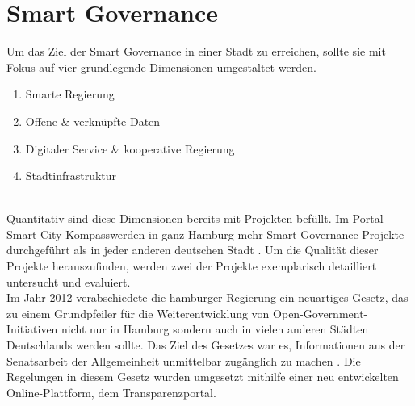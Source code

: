 \section{Smart Governance}

Um das Ziel der Smart Governance in einer Stadt zu erreichen, sollte sie mit Fokus auf vier grundlegende Dimensionen umgestaltet werden.
\begin{enumerate}
	\item Smarte Regierung
	\item Offene \& verknüpfte Daten
	\item Digitaler Service \& kooperative Regierung
	\item Stadtinfrastruktur
\end{enumerate}
\autocite[14]{Fuetterer.2020}
\\ Quantitativ sind diese Dimensionen bereits mit Projekten befüllt. Im Portal \glqq Smart City Kompass\grqq werden in ganz Hamburg mehr Smart-Governance-Projekte durchgeführt als in jeder anderen deutschen Stadt \autocite{SmartCityKompass.2020}. Um die Qualität dieser Projekte herauszufinden, werden zwei der Projekte exemplarisch detailliert untersucht und evaluiert.
\\ Im Jahr 2012 verabschiedete die hamburger Regierung ein neuartiges Gesetz, das zu einem Grundpfeiler für die Weiterentwicklung von Open-Government-Initiativen nicht nur in Hamburg sondern auch in vielen anderen Städten Deutschlands werden sollte. Das Ziel des Gesetzes war es, Informationen aus der Senatsarbeit der Allgemeinheit unmittelbar zugänglich zu machen \autocite{Senat.2012}. Die Regelungen in diesem Gesetz wurden umgesetzt mithilfe einer neu entwickelten Online-Plattform, dem \glqq Transparenzportal\grqq.




